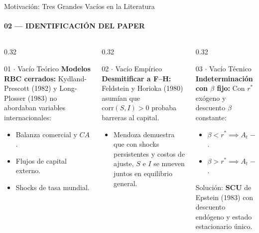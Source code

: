 \documentclass[aspectratio=169, 10pt]{beamer}
\begin{document}
\begin{frame}{Motivación: Tres Grandes Vacíos en la Literatura}
    \framesubtitle{02 --- IDENTIFICACIÓN DEL PAPER}
    \begin{columns}[T]
        \begin{column}{0.32\textwidth}
            \begin{block}{01 $\cdot$ Vacío Teórico}
                \scriptsize
                \textbf{Modelos RBC cerrados:}
                Kydland-Prescott (1982) y Long-Plosser (1983) no abordaban variables internacionales:
                \begin{itemize}
                    \item Balanza comercial y $CA$.
                    \item Flujos de capital externo.
                    \item Shocks de tasa mundial.
                \end{itemize}
            \end{block}
        \end{column}
        \begin{column}{0.32\textwidth}
            \begin{block}{02 $\cdot$ Vacío Empírico}
                \scriptsize
                \textbf{Desmitificar a F--H:}
                Feldstein y Horioka (1980) asumían que $\text{corr}(S,I)>0$ probaba barreras al capital.
                \begin{itemize}
                    \item Mendoza demuestra que con shocks persistentes y costos de ajuste, $S$ e $I$ se mueven juntos en equilibrio general.
                \end{itemize}
            \end{block}
        \end{column}
        \begin{column}{0.32\textwidth}
            \begin{block}{03 $\cdot$ Vacío Técnico}
                \scriptsize
                \textbf{Indeterminación con $\beta$ fijo:}
                Con $r^*$ exógeno y descuento $\beta$ constante:
                \begin{itemize}
                    \item $\beta < r^* \implies A_t \to +\infty$.
                    \item $\beta > r^* \implies A_t \to -\infty$.
                \end{itemize}
                Solución: \textbf{SCU} de Epstein (1983) con descuento endógeno y estado estacionario único.
            \end{block}
        \end{column}
    \end{columns}
\end{frame}
\end{document}

